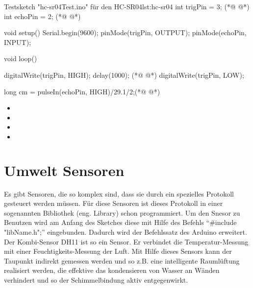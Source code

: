 \begin{multicols}{2}
\begin{arduinoCode}{Testsketch "hc-sr04Test.ino" für den HC-SR04}{lst:hc-sr04}
int trigPin = 3; (*@  @*)
int echoPin = 2; (*@  @*)

void setup() { 
  Serial.begin(9600);
  pinMode(trigPin, OUTPUT); 
  pinMode(echoPin, INPUT); 
}

void loop() {
  digitalWrite(trigPin, HIGH); 
  delay(1000);                   (*@  @*)
  digitalWrite(trigPin, LOW);

  long cm = pulseIn(echoPin, HIGH)/29.1/2;(*@  @*)
}
\end{arduinoCode}
\vfill\null 
\columnbreak
\null\vfill 
\begin{itemize}
  \itemsep15pt
  \item[] 
  \item[] 
  \itemsep45pt
  \item[] 
  \itemsep35pt
  \item[] 
  \itemsep15pt
\end{itemize}
\vfill \null


\end{multicols}

\clearpage

\section{Umwelt Sensoren}
\label{sec:UmweltSensoren}

Es gibt Sensoren, die so komplex sind, dass sie durch ein spezielles Protokoll gesteuert werden müssen. Für diese Sensoren ist dieses Protokoll in einer sogenannten Bibliothek (eng. Library) schon programmiert. Um den Snesor zu Benutzen wird am Anfang des Sketches diese mit Hilfe des Befehls ``\#include "libName.h";'' eingebunden. Dadurch wird der Befehlssatz des Arduino erweitert. Der Kombi-Sensor DH11 ist so ein Sensor. Er verbindet die Temperatur-Messung mit einer Feuchtigkeits-Messung der Luft. Mit Hilfe dieses Sensors kann der Taupunkt indirekt gemessen werden und so z.B. eine intelligente Raumlüftung realisiert werden, die effektive das kondensieren von Wasser an Wänden verhindert und so der Schimmelbindung aktiv entgegenwirkt. 



